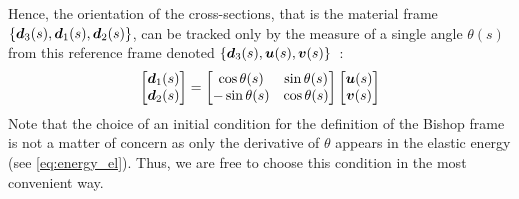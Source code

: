 Hence, the orientation of the cross-sections, that is the material frame $\{\boldsymbol{d}_3 (s),\boldsymbol{d}_1 (s),\boldsymbol{d}_2 (s)\}$, can be tracked only by the measure of a single angle $\theta(s)$ from this reference frame denoted $\{\boldsymbol{d}_3(s),\boldsymbol{u}(s),\boldsymbol{v}(s)\}$~:
\begin{equation}
	\begin{bmatrix}
		\boldsymbol{d}_1(s)\\
		\boldsymbol{d}_2(s)\\
	\end{bmatrix} =
		\begin{bmatrix}
		\cos{\theta(s)} & \sin{\theta(s)}\\
		-\sin{\theta(s)} & \cos{\theta(s)}\\
	\end{bmatrix}
	\begin{bmatrix}
		\boldsymbol{u}(s)\\
		\boldsymbol{v}(s)\\
	\end{bmatrix}
	\label{eq:crvangle_matrix}
\end{equation}
Note that the choice of an initial condition for the definition of the Bishop frame is not a matter of concern as only the derivative of $\theta$ appears in the elastic energy (see \cref{eq:energy_el}). Thus, we are free to choose this condition in the most convenient way.


